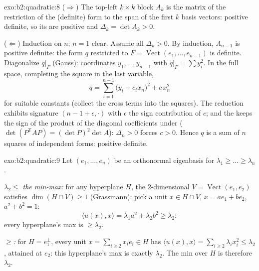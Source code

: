 \begin{solution}{exo:b2:quadratic:8}
($\Rightarrow$) The top-left $k \times k$ block $A_k$ is the matrix
of the restriction of the (definite) form to the span of the first
$k$ basis vectors: positive definite, so its  are
positive and $\Delta_k = \det A_k > 0$.

($\Leftarrow$) Induction on $n$; $n = 1$ clear. Assume all
$\Delta_k > 0$. By induction, $A_{n-1}$ is positive definite: the
form $q$ restricted to $F = \operatorname{Vect}(e_1, \dots,
e_{n-1})$ is definite. Diagonalize $q|_F$ (Gauss): coordinates
$y_1, \dots, y_{n-1}$ with $q|_F = \sum y_i^2$. In the full space,
completing the square in the last variable,
\[
q = \sum_{i=1}^{n-1} \bigl(y_i + c_i x_n\bigr)^2 + c\,x_n^2
\]
for suitable constants (collect the cross terms into the squares).
The reduction exhibits signature $(n-1 + \epsilon, \cdot)$ with
$\epsilon$ the sign contribution of $c$; and the  keeps
the sign of the product of the diagonal coefficients under
 ($\det(P^{\mathsf T}AP) = (\det P)^2\det A$): $\Delta_n
> 0$ forces $c > 0$. Hence $q$ is a sum of $n$ squares of
independent forms: positive definite.
\end{solution}

\begin{solution}{exo:b2:quadratic:9}
Let $(e_1, \dots, e_n)$ be an orthonormal eigenbasis for $\lambda_1
\geq \dots \geq \lambda_n$.

\emph{$\lambda_2 \leq$ the min-max:} for any hyperplane $H$, the
$2$-dimensional $V = \operatorname{Vect}(e_1, e_2)$ satisfies
$\dim(H \cap V) \geq 1$ (Grassmann): pick a unit $x \in H \cap V$,
$x = ae_1 + be_2$, $a^2 + b^2 = 1$:
\[
\langle u(x), x\rangle = \lambda_1 a^2 + \lambda_2 b^2 \geq
\lambda_2 :
\]
every hyperplane's max is $\geq \lambda_2$.

\emph{$\geq$:} for $H = e_1^{\perp}$, every unit $x = \sum_{i\geq2}
x_ie_i \in H$ has $\langle u(x), x\rangle = \sum_{i \geq 2}
\lambda_i x_i^2 \leq \lambda_2$, attained at $e_2$: this
hyperplane's max is exactly $\lambda_2$. The min over $H$ is
therefore $\lambda_2$.
\end{solution}

